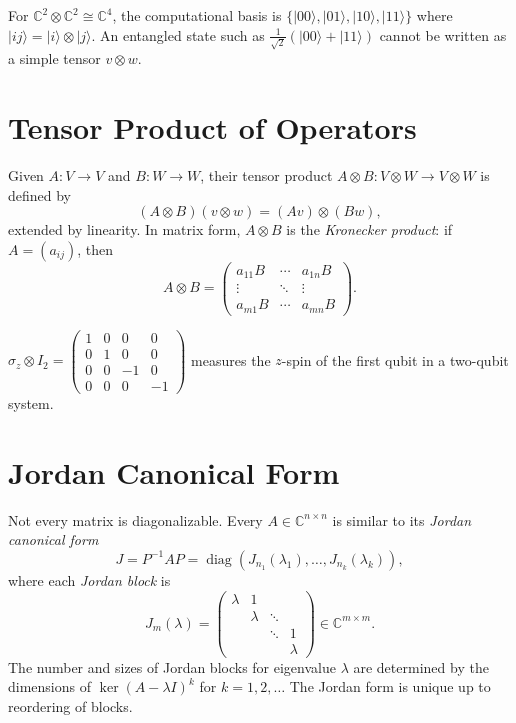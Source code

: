 \begin{example}
For $\mathbb{C}^2\otimes\mathbb{C}^2 \cong \mathbb{C}^4$, the computational basis is $\{|00\rangle, |01\rangle, |10\rangle, |11\rangle\}$ where $|ij\rangle = |i\rangle\otimes|j\rangle$. An entangled state such as $\frac{1}{\sqrt{2}}(|00\rangle+|11\rangle)$ cannot be written as a simple tensor $v\otimes w$.
\end{example}

\section{Tensor Product of Operators}

Given $A: V\to V$ and $B: W\to W$, their tensor product $A\otimes B: V\otimes W\to V\otimes W$ is defined by
\[
  (A\otimes B)(v\otimes w) = (Av)\otimes(Bw),
\]
extended by linearity. In matrix form, $A\otimes B$ is the \emph{Kronecker product}: if $A=(a_{ij})$, then
\[
  A\otimes B = \begin{pmatrix}a_{11}B & \cdots & a_{1n}B\\ \vdots & \ddots & \vdots\\ a_{m1}B & \cdots & a_{mn}B\end{pmatrix}.
\]

\begin{example}
$\sigma_z\otimes I_2 = \begin{pmatrix}1&0&0&0\\0&1&0&0\\0&0&-1&0\\0&0&0&-1\end{pmatrix}$ measures the $z$-spin of the first qubit in a two-qubit system.
\end{example}

\section{Jordan Canonical Form}

Not every matrix is diagonalizable. Every $A\in\mathbb{C}^{n\times n}$ is similar to its \emph{Jordan canonical form}
\[
  J = P^{-1}AP = \operatorname{diag}(J_{n_1}(\lambda_1),\ldots,J_{n_k}(\lambda_k)),
\]
where each \emph{Jordan block} is
\[
  J_m(\lambda) = \begin{pmatrix}\lambda & 1 & & \\ & \lambda & \ddots & \\ & & \ddots & 1 \\ & & & \lambda\end{pmatrix} \in \mathbb{C}^{m\times m}.
\]
The number and sizes of Jordan blocks for eigenvalue $\lambda$ are determined by the dimensions of $\ker(A-\lambda I)^k$ for $k=1,2,\ldots$ The Jordan form is unique up to reordering of blocks.

